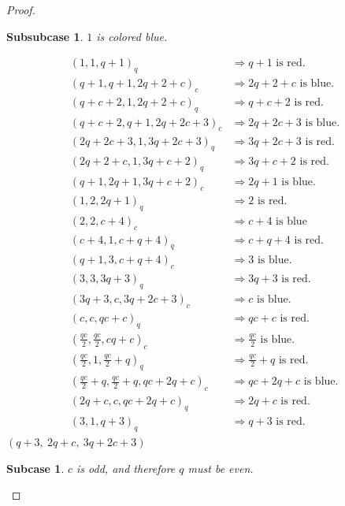 \documentclass[10pt,a4paper]{amsart}
\newtheorem{subcase}{Subcase}
\newtheorem{subsubcase}{Subsubcase}
\begin{document}
\begin{proof}
\begin{subsubcase}
    $1$ is colored blue.
\end{subsubcase}
\begingroup
\setlength{\jot}{2pt}
\begin{align*}
(1,1,q+1)_q&\Longrightarrow q+1 \text{ is red.}\\
(q+1,q+1,2q+2+c)_c&\Longrightarrow 2q+2+c \text{ is blue.}\\
(q+c+2,1,2q+2+c)_q&\Longrightarrow q+c+2 \text{ is red.}\\
(q+c+2,q+1,2q+2c+3)_c&\Longrightarrow 2q+2c+3 \text{ is blue.}\\
(2q+2c+3,1,3q+2c+3)_q&\Longrightarrow 3q+2c+3 \text{ is red.}\\
(2q+2+c,1,3q+c+2)_q&\Longrightarrow 3q+c+2 \text{ is red.}\\
(q+1,2q+1,3q+c+2)_c&\Longrightarrow 2q+1 \text{ is blue.}\\
(1,2,2q+1)_q&\Longrightarrow 2 \text{ is red.}\\
(2,2,c+4)_c&\Longrightarrow c+4 \text{ is blue}\\
(c+4,1,c+q+4)_q&\Longrightarrow c+q+4 \text{ is red.}\\
(q+1,3,c+q+4)_c&\Longrightarrow 3 \text{ is blue.}\\
(3,3,3q+3)_q&\Longrightarrow 3q+3 \text{ is red.}\\
(3q+3,c,3q+2c+3)_c&\Longrightarrow c \text{ is blue.}\\
(c,c,qc+c)_q&\Longrightarrow qc+c \text{ is red.}\\
(\tfrac{qc}{2},\tfrac{qc}{2},cq+c)_c&\Longrightarrow \tfrac{qc}{2} \text{ is blue.}\\
(\tfrac{qc}{2},1,\tfrac{qc}{2}+q)_q&\Longrightarrow \tfrac{qc}{2}+q \text{ is red.}\\
(\tfrac{qc}{2}+q,\tfrac{qc}{2}+q,qc+2q+c)_c&\Longrightarrow qc+2q+c \text{ is blue.}\\
(2q+c,c,qc+2q+c)_q&\Longrightarrow 2q+c \text{ is red.}\\
(3,1,q+3)_q&\Longrightarrow q+3 \text{ is red.}
\end{align*}
$(q+3,\ 2q+c,\ 3q+2c+3)$
\endgroup

\begin{subcase}
    $c$ is odd, and therefore $q$ must be even.
\end{subcase}




\end{proof}
\end{document}
